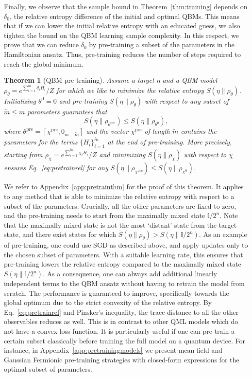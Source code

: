\documentclass[
    aps,
    prx,
    onecolumn
]{revtex4-2}
\newtheorem{theorem}{Theorem}
\begin{document}
Finally, we observe that the sample bound in Theorem~\ref{thm:training} depends on $\delta_0$, the relative entropy difference of the initial and optimal QBMs. This means that if we can lower the initial relative entropy with an educated guess, we also tighten the bound on the QBM learning sample complexity. In this respect, we prove that we can reduce $\delta_0$ by pre-training a subset of the parameters in the Hamiltonian ansatz. Thus, pre-training reduces the number of steps required to reach the global minimum.

\begin{theorem}[QBM pre-training]
\label{thm:pretraining}
    Assume a target $\eta$ and a QBM model $\rho_\theta=e^{\sum_{i=1}^m \theta_i H_i}/Z$ for which we like to minimize the relative entropy $S(\eta \|\rho_\theta)$. Initializing $\theta^0=0$ and pre-training $S(\eta\| \rho_\theta)$ with respect to any subset of $\tilde{m} \leq m $ parameters guarantees that \begin{equation}\label{eq:pretrainrel}
         S(\eta \|\rho_{\theta^\mathrm{pre}}) \leq S(\eta \|\rho_{\theta^0}), 
    \end{equation} where $\theta^\mathrm{pre} = [\chi^{\mathrm{pre}}, 0_{m-\tilde{m}}]$ and the vector $\chi^{\mathrm{pre}}$ of length $\tilde{m}$ contains the parameters for the terms $\{H_i\}_{i=1}^{\tilde{m}}$ at the end of pre-training.
    More precisely, starting from $\rho_\chi=e^{\sum_{i=1}^{\tilde{m}} \chi_i H_i}/Z$ and minimizing $S(\eta \|\rho_\chi)$ with respect to $\chi$ ensures Eq.~\eqref{eq:pretrainrel} for any $S(\eta \|\rho_{\chi^{\mathrm{pre}}})\leq S(\eta \|\rho_{\chi^0})$.
\end{theorem}

We refer to Appendix~\ref{app:pretrainthm} for the proof of this theorem. It applies to any method that is able to minimize the relative entropy with respect to a subset of the parameters. Crucially, all the other parameters are fixed to zero, and the pre-training needs to start from the maximally mixed state $\mathbb{I}/2^n$. Note that the maximally mixed state is not the most `distant' state from the target state, and there exist states for which $S(\eta \| \rho_\theta) > S(\eta \| \mathbb{I}/2^n)$. As an example of pre-training, one could use SGD as described above, and apply updates only to the chosen subset of parameters. With a suitable learning rate, this ensures that pre-training lowers the relative entropy compared to the maximally mixed state $S(\eta \|\mathbb{I}/2^n)$. As a consequence, one can always add additional linearly independent terms to the QBM ansatz without having to retrain the model from scratch. The performance is guaranteed to improve, specifically towards the global optimum due to the strict convexity of the relative entropy. By Eq.~\eqref{eq:pretrainrel} and Pinsker's inequality, the trace-distance to all the other observables reduces as well. This is in contrast to other QML models which do not have a convex loss function. It is particularly useful if one can pre-train a certain subset classically before training the full model on a quantum device. For instance, in Appendix~\ref{app:pretrainingmodels} we present mean-field and Gaussian Fermionic pre-training strategies with closed-form expressions for the optimal subset of parameters.
\end{document}
